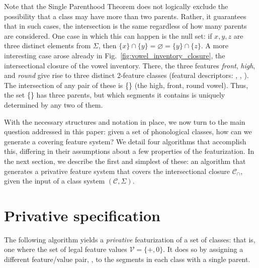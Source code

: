 \documentclass[11pt, oneside]{article}   	%
\begin{document}
\vspace{\baselineskip} Note that the Single Parenthood Theorem does not logically exclude the possibility that a class may have more than two parents. Rather, it guarantees that in such cases, the intersection is the same regardless of how many parents are considered. One case in which this can happen is the null set: if $x, y, z$ are three distinct elements from $\Sigma$, then $\{ x \} \cap \{ y \} = \varnothing = \{ y \} \cap \{ z \}$. A more interesting case arose already in Fig.~\ref{fig:vowel_inventory_closure}, the intersectional closure of the vowel inventory. There, the three features \textit{front}, \textit{high}, and \textit{round} give rise to three distinct 2-feature classes (featural descriptors: , , ). The intersection of any pair of these is \{\} (the high, front, round vowel). Thus, the set  \{\} has three parents, but which segments it contains is uniquely determined by any two of them.

With the necessary structures and notation in place, we now turn to the main question addressed in this paper: given a set of phonological classes, how can we generate a covering feature system? We detail four algorithms that accomplish this, differing in their assumptions about a few properties of the featurization. In the next section, we describe the first and simplest of these: an algorithm that generates a privative feature system that covers the intersectional closure $\mathcal C_\cap$, given the input of a class system $(\mathcal C, \Sigma)$.

\FloatBarrier
\section{Privative specification}
\label{sec:privative}

The following algorithm yields a \textit{privative} featurization of a set of classes: that is, one where the set of legal feature values $\mathcal V = \{+, 0\}$. It does so by assigning a different feature/value pair, , to the segments in each class with a single parent.
 
\end{document}
